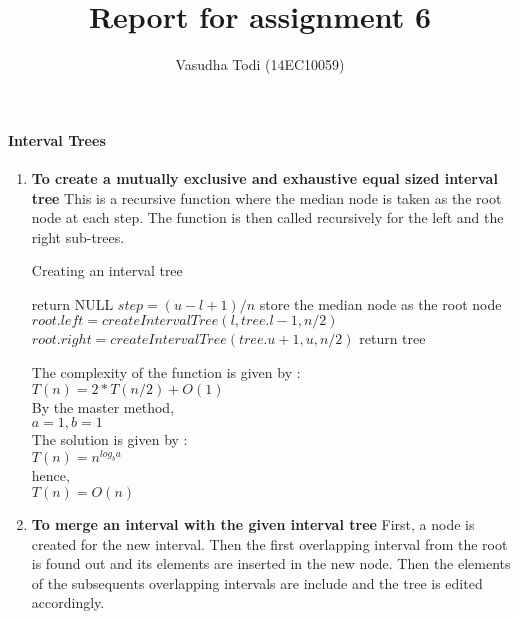 \documentclass[a4paper,11pt]{article}
\title{Report for assignment 6}
\author{Vasudha Todi (14EC10059)}
\begin{document}
\maketitle


\paragraph{Interval Trees}
\begin{enumerate}
 \item \textbf{To create a mutually exclusive and exhaustive equal sized interval tree}
This is a recursive function where the median node is taken as the root node at each step. The function is then called recursively for the left and the right sub-trees. 


  \begin{algorithm}
    \caption{Creating an interval tree}
    \begin{algorithmic}[1]
        \State return NULL
    \EndIf
    \State $step = (u-l+1)/n$
    \State store the median node as the root node
    \State $root.left = createIntervalTree(l,tree.l-1,n/2)$
    \State $root.right = createIntervalTree(tree.u+1,u,n/2)$
    \State return tree
    \end{algorithmic}
  \end{algorithm}
  
  
  
  The complexity of the function is given by :\\
  $T(n) = 2*T(n/2) + O(1)$\\
  By the master method,\\
  $a=1, b=1$\\
  The solution is given by :\\
  $T(n) = n^{log_{b}a}$\\
  hence,\\
    $T(n) = O(n)$

 \item \textbf{To merge an interval with the given interval tree}
First, a node is created for the new interval. Then the first overlapping interval from the root is found out and its elements are inserted in the new node. Then the elements of the subsequents overlapping intervals are include and the tree is edited accordingly.\\\\



\end{enumerate}
\end{document}
